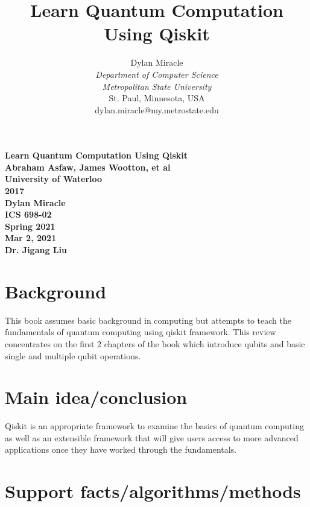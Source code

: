 \documentclass{article}
\begin{document}
\begin{titlepage}
    \begin{center}
        \vspace{4cm}
        \large
        \textbf{
            Learn Quantum Computation Using Qiskit \\
            Abraham Asfaw, James Wootton, et al \\
            University of Waterloo \\
            2017 \\
            Dylan Miracle \\
            ICS 698-02 \\
            Spring 2021 \\
            Mar 2, 2021 \\
            Dr. Jigang Liu
        }
    \end{center}
\end{titlepage}
\title{Learn Quantum Computation Using Qiskit}

\author{Dylan Miracle\\
\textit{Department of Computer Science} \\
\textit{Metropolitan State University}\\
St. Paul, Minnesota, USA \\
dylan.miracle@my.metrostate.edu
}

\maketitle
\section{Background}
This book assumes basic background in computing but attempts to teach the fundamentals of quantum computing using qiskit framework. This review concentrates on the first 2 chapters of the book which introduce qubits and basic single and multiple qubit operations. 

\section{Main idea/conclusion}
Qiskit is an appropriate framework to examine the basics of quantum computing as well as an extensible framework that will give users access to more advanced applications once they have worked through the fundamentals. 

\section{Support facts/algorithms/methods}
\end{document}
